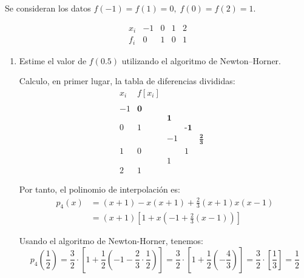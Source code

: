 \begin{ejercicio}
    Se consideran los datos $f(-1) = f(1) = 0,\;f(0) = f(2) = 1$.

    \begin{equation*}
        \begin{array}{c|cccc}
            x_i & -1 & 0 & 1 & 2 \\ \hline
            f_i & 0 & 1 & 0 & 1
        \end{array}
    \end{equation*}
    
    \begin{enumerate}
        \item Estime el valor de $f(0.5)$ utilizando el algoritmo de Newton–Horner.        

        Calculo, en primer lugar, la tabla de diferencias divididas:
        \begin{equation*}
            \begin{array}{c|cccccc}
                x_i & f[x_i] \\
                \\
                -1 & \textbf{0} \\
                && \textbf{1}\\
                0 & 1 && \textbf{-1}\\
                && -1&&\mathbf{\frac{2}{3}}\\
                1 & 0 && 1 &&\\
                && 1\\
                2 & 1
            \end{array}
        \end{equation*}

        Por tanto, el polinomio de interpolación es:
        \begin{equation*}
            \begin{split}
                p_4(x) &= (x+1) -x(x+1) +\frac{2}{3}(x+1)x(x-1) \\
                &= (x+1)\left[1+x\left(-1 +\frac{2}{3}(x-1)\right)\right]
            \end{split}
        \end{equation*}

        Usando el algoritmo de Newton-Horner, tenemos:
        \begin{equation*}
            p_4\left(\frac{1}{2}\right) = \frac{3}{2}\cdot \left[1+\frac{1}{2}\left(-1-\frac{2}{3}\cdot \frac{1}{2}\right)\right] 
            = \frac{3}{2}\cdot \left[1+\frac{1}{2}\left(-\frac{4}{3}\right)\right]
            = \frac{3}{2}\cdot \left[\frac{1}{3}\right] = \frac{1}{2}
        \end{equation*}



\end{enumerate}
\end{ejercicio}
